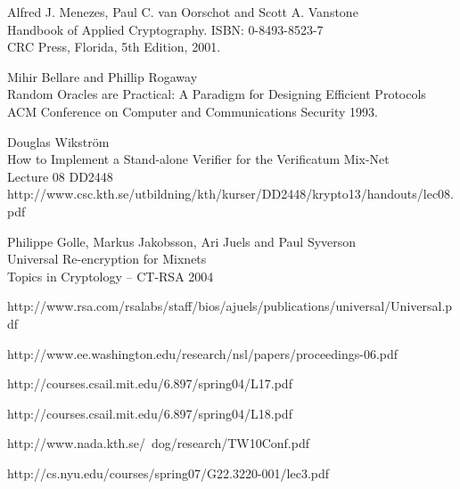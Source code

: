 \clearpage
\begin{thebibliography}{9}

  Alfred J. Menezes, Paul C. van Oorschot and Scott A. Vanstone\\
  Handbook of Applied Cryptography.
  ISBN: 0-8493-8523-7\\
  CRC Press, Florida,
  5th Edition,
  2001.

   Mihir Bellare and Phillip Rogaway\\
   Random Oracles are Practical: A Paradigm for Designing Efficient Protocols\\
   ACM Conference on Computer and Communications Security 1993.

   Douglas Wikström\\
   How to Implement a Stand-alone Verifier for the Verificatum Mix-Net\\

  Lecture 08 DD2448
  http://www.csc.kth.se/utbildning/kth/kurser/DD2448/krypto13/handouts/lec08.pdf

   Philippe Golle, Markus Jakobsson, Ari Juels and Paul Syverson\\
   Universal Re-encryption for Mixnets\\
   Topics in Cryptology – CT-RSA 2004

   http://www.rsa.com/rsalabs/staff/bios/ajuels/publications/universal/Universal.pdf


http://www.ee.washington.edu/research/nsl/papers/proceedings-06.pdf

  http://courses.csail.mit.edu/6.897/spring04/L17.pdf

  http://courses.csail.mit.edu/6.897/spring04/L18.pdf

http://www.nada.kth.se/~dog/research/TW10Conf.pdf

http://cs.nyu.edu/courses/spring07/G22.3220-001/lec3.pdf


\end{thebibliography}
